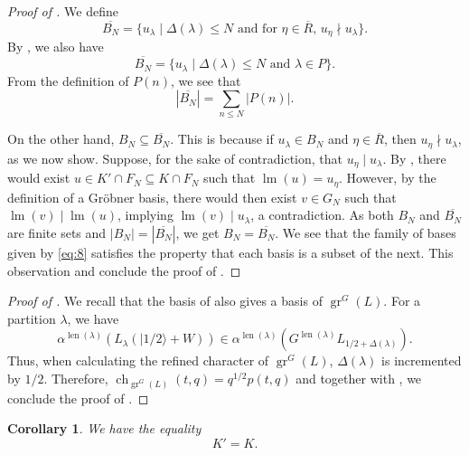 \documentclass[a4paper, 12pt, reqno]{amsart}
\newtheorem{corollary}[theorem]{Corollary}
\theoremstyle{remark}
\DeclareMathOperator{\gr}{gr}
\DeclareMathOperator{\ch}{ch}
\DeclareMathOperator{\lm}{lm}
\DeclareMathOperator{\len}{len}
\newcommand{\vachalf}{{|1/2\rangle}}
\begin{document}
\begin{proof}[Proof of ]
  We define
  \begin{equation*}
    \overline{B_N} = \{u_{\lambda} \mid \text{$\Delta(\lambda) \le N$ and for $\eta \in \overline{R}$, $u_{\eta} \nmid u_{\lambda}$}\}.
  \end{equation*}
  By , we also have
  \begin{equation*}
    \overline{B_N} = \{u_{\lambda} \mid \text{$\Delta(\lambda) \le N$ and $\lambda \in P$}\}.
  \end{equation*}
  From the definition of $P(n)$, we see that
  \begin{equation*}
    |\overline{B_N}| = \sum_{n \le N}|P(n)|.
  \end{equation*}

  On the other hand, $B_N \subseteq \overline{B_N}$.
  This is because if $u_{\lambda} \in B_N$ and $\eta \in \overline{R}$, then $u_{\eta} \nmid u_{\lambda}$, as we now show.
  Suppose, for the sake of contradiction, that $u_{\eta} \mid u_{\lambda}$.
  By , there would exist $u \in K' \cap F_N \subseteq K \cap F_N$ such that $\lm(u) = u_{\eta}$.
  However, by the definition of a Gröbner basis, there would then exist $v \in G_N$ such that $\lm(v) \mid \lm(u)$, implying $\lm(v) \mid u_{\lambda}$, a contradiction.
  As both $B_N$ and $\overline{B_N}$ are finite sets and $|B_N| = |\overline{B_N}|$, we get $B_N = \overline{B_N}$.
  We see that the family of bases given by \eqref{eq:8} satisfies the property that each basis is a subset of the next.
  This observation and  conclude the proof of .
\end{proof}

\begin{proof}[Proof of ]
  We recall that the basis of  also gives a basis of $\gr^G(L)$.
  For a partition $\lambda$, we have
  \begin{equation*}
    \alpha^{\len(\lambda)}(L_{\lambda}(\vachalf + W)) \in \alpha^{\len(\lambda)}(G^{\len(\lambda)}L_{1/2 + \Delta(\lambda)}).
  \end{equation*}
  Thus, when calculating the refined character of $\gr^G(L)$, $\Delta(\lambda)$ is incremented by $1/2$.
  Therefore, $\ch_{\gr^G(L)}(t, q) = q^{1/2}p(t, q)$ and together with , we conclude the proof of .
\end{proof}

\begin{corollary}
  \label{crl:1}
  We have the equality
  \begin{equation*}
    K' = K.
  \end{equation*}
\end{corollary}
\end{document}
